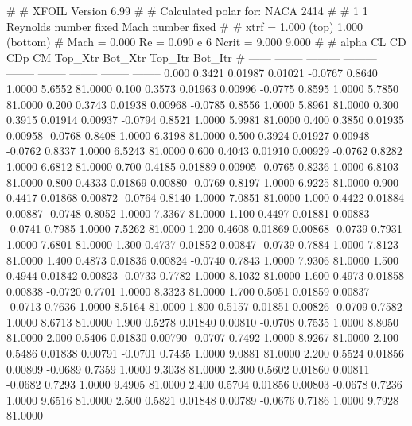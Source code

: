 #  
#       XFOIL         Version 6.99
#  
# Calculated polar for: NACA 2414                                       
#  
# 1 1 Reynolds number fixed          Mach number fixed         
#  
# xtrf =   1.000 (top)        1.000 (bottom)  
# Mach =   0.000     Re =     0.090 e 6     Ncrit =   9.000  9.000
#  
#   alpha    CL        CD       CDp       CM     Top_Xtr  Bot_Xtr  Top_Itr  Bot_Itr
#  ------ -------- --------- --------- -------- -------- -------- -------- --------
   0.000   0.3421   0.01987   0.01021  -0.0767   0.8640   1.0000   5.6552  81.0000
   0.100   0.3573   0.01963   0.00996  -0.0775   0.8595   1.0000   5.7850  81.0000
   0.200   0.3743   0.01938   0.00968  -0.0785   0.8556   1.0000   5.8961  81.0000
   0.300   0.3915   0.01914   0.00937  -0.0794   0.8521   1.0000   5.9981  81.0000
   0.400   0.3850   0.01935   0.00958  -0.0768   0.8408   1.0000   6.3198  81.0000
   0.500   0.3924   0.01927   0.00948  -0.0762   0.8337   1.0000   6.5243  81.0000
   0.600   0.4043   0.01910   0.00929  -0.0762   0.8282   1.0000   6.6812  81.0000
   0.700   0.4185   0.01889   0.00905  -0.0765   0.8236   1.0000   6.8103  81.0000
   0.800   0.4333   0.01869   0.00880  -0.0769   0.8197   1.0000   6.9225  81.0000
   0.900   0.4417   0.01868   0.00872  -0.0764   0.8140   1.0000   7.0851  81.0000
   1.000   0.4422   0.01884   0.00887  -0.0748   0.8052   1.0000   7.3367  81.0000
   1.100   0.4497   0.01881   0.00883  -0.0741   0.7985   1.0000   7.5262  81.0000
   1.200   0.4608   0.01869   0.00868  -0.0739   0.7931   1.0000   7.6801  81.0000
   1.300   0.4737   0.01852   0.00847  -0.0739   0.7884   1.0000   7.8123  81.0000
   1.400   0.4873   0.01836   0.00824  -0.0740   0.7843   1.0000   7.9306  81.0000
   1.500   0.4944   0.01842   0.00823  -0.0733   0.7782   1.0000   8.1032  81.0000
   1.600   0.4973   0.01858   0.00838  -0.0720   0.7701   1.0000   8.3323  81.0000
   1.700   0.5051   0.01859   0.00837  -0.0713   0.7636   1.0000   8.5164  81.0000
   1.800   0.5157   0.01851   0.00826  -0.0709   0.7582   1.0000   8.6713  81.0000
   1.900   0.5278   0.01840   0.00810  -0.0708   0.7535   1.0000   8.8050  81.0000
   2.000   0.5406   0.01830   0.00790  -0.0707   0.7492   1.0000   8.9267  81.0000
   2.100   0.5486   0.01838   0.00791  -0.0701   0.7435   1.0000   9.0881  81.0000
   2.200   0.5524   0.01856   0.00809  -0.0689   0.7359   1.0000   9.3038  81.0000
   2.300   0.5602   0.01860   0.00811  -0.0682   0.7293   1.0000   9.4905  81.0000
   2.400   0.5704   0.01856   0.00803  -0.0678   0.7236   1.0000   9.6516  81.0000
   2.500   0.5821   0.01848   0.00789  -0.0676   0.7186   1.0000   9.7928  81.0000
